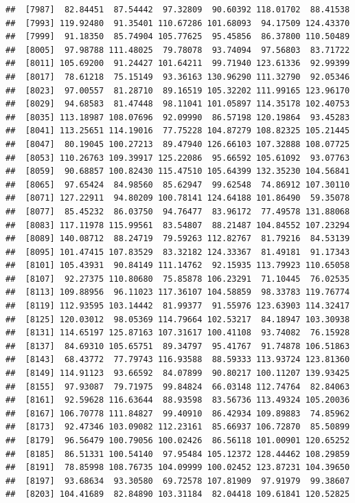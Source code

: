 \documentclass[
]{article}
\begin{document}
\begin{verbatim}
##  [7987]  82.84451  87.54442  97.32809  90.60392 118.01702  88.41538
##  [7993] 119.92480  91.35401 110.67286 101.68093  94.17509 124.43370
##  [7999]  91.18350  85.74904 105.77625  95.45856  86.37800 110.50489
##  [8005]  97.98788 111.48025  79.78078  93.74094  97.56803  83.71722
##  [8011] 105.69200  91.24427 101.64211  99.71940 123.61336  92.99399
##  [8017]  78.61218  75.15149  93.36163 130.96290 111.32790  92.05346
##  [8023]  97.00557  81.28710  89.16519 105.32202 111.99165 123.96170
##  [8029]  94.68583  81.47448  98.11041 101.05897 114.35178 102.40753
##  [8035] 113.18987 108.07696  92.09990  86.57198 120.19864  93.45283
##  [8041] 113.25651 114.19016  77.75228 104.87279 108.82325 105.21445
##  [8047]  80.19045 100.27213  89.47940 126.66103 107.32888 108.07725
##  [8053] 110.26763 109.39917 125.22086  95.66592 105.61092  93.07763
##  [8059]  90.68857 100.82430 115.47510 105.64399 132.35230 104.56841
##  [8065]  97.65424  84.98560  85.62947  99.62548  74.86912 107.30110
##  [8071] 127.22911  94.80209 100.78141 124.64188 101.86490  59.35078
##  [8077]  85.45232  86.03750  94.76477  83.96172  77.49578 131.88068
##  [8083] 117.11978 115.99561  83.54807  88.21487 104.84552 107.23294
##  [8089] 140.08712  88.24719  79.59263 112.82767  81.79216  84.53139
##  [8095] 101.47415 107.83529  83.32182 124.33367  81.49181  91.17343
##  [8101] 105.43931  90.84149 111.14762  92.15935 113.79923 110.65058
##  [8107]  92.27375 110.80680  75.85878 106.23291  71.10445  76.02535
##  [8113] 109.88956  96.11023 117.36107 104.58859  98.33783 119.76774
##  [8119] 112.93595 103.14442  81.99377  91.55976 123.63903 114.32417
##  [8125] 120.03012  98.05369 114.79664 102.53217  84.18947 103.30938
##  [8131] 114.65197 125.87163 107.31617 100.41108  93.74082  76.15928
##  [8137]  84.69310 105.65751  89.34797  95.41767  91.74878 106.51863
##  [8143]  68.43772  77.79743 116.93588  88.59333 113.93724 123.81360
##  [8149] 114.91123  93.66592  84.07899  90.80217 100.11207 139.93425
##  [8155]  97.93087  79.71975  99.84824  66.03148 112.74764  82.84063
##  [8161]  92.59628 116.63644  88.93598  83.56736 113.49324 105.20036
##  [8167] 106.70778 111.84827  99.40910  86.42934 109.89883  74.85962
##  [8173]  92.47346 103.09082 112.23161  85.66937 106.72870  85.50899
##  [8179]  96.56479 100.79056 100.02426  86.56118 101.00901 120.65252
##  [8185]  86.51331 100.54140  97.95484 105.12372 128.44462 108.29859
##  [8191]  78.85998 108.76735 104.09999 100.02452 123.87231 104.39650
##  [8197]  93.68634  93.30580  69.72578 107.81909  97.91979  99.38607
##  [8203] 104.41689  82.84890 103.31184  82.04418 109.61841 120.52825

\end{verbatim}
\end{document}
